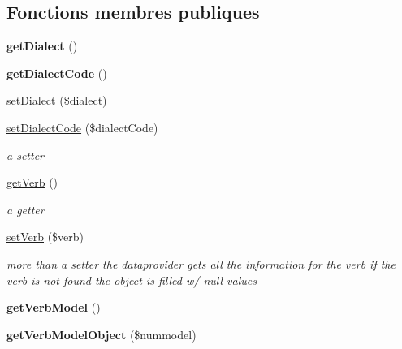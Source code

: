 \subsection*{Fonctions membres publiques}
\begin{DoxyCompactItemize}
\item 
\hypertarget{classConjugationManagerBase_a50aa5bd320294aa9683a54dc1b51273f}{}\label{classConjugationManagerBase_a50aa5bd320294aa9683a54dc1b51273f} 
{\bfseries get\+Dialect} ()
\item 
\hypertarget{classConjugationManagerBase_a4f3830c6823fd2add6dc25a69a0e507c}{}\label{classConjugationManagerBase_a4f3830c6823fd2add6dc25a69a0e507c} 
{\bfseries get\+Dialect\+Code} ()
\item 
\hyperlink{classConjugationManagerBase_a266802b93062d79fa75c460dc72945d8}{set\+Dialect} (\$dialect)
\item 
\hyperlink{classConjugationManagerBase_a98c6196247fa40cca8701324bdf36897}{set\+Dialect\+Code} (\$dialect\+Code)
\begin{DoxyCompactList}\small\item\em a setter \end{DoxyCompactList}\item 
\hyperlink{classConjugationManagerBase_ae6e9d7d21418b8b9831b2b1f29eca4a6}{get\+Verb} ()
\begin{DoxyCompactList}\small\item\em a getter \end{DoxyCompactList}\item 
\hyperlink{classConjugationManagerBase_a36a53a9f0bc2114a5429bcf9e3cd351e}{set\+Verb} (\$verb)
\begin{DoxyCompactList}\small\item\em more than a setter the dataprovider gets all the information for the verb if the verb is not found the object is filled w/ null values \end{DoxyCompactList}\item 
\hypertarget{classConjugationManagerBase_aecf22ced680433bb1c366d0de3931bac}{}\label{classConjugationManagerBase_aecf22ced680433bb1c366d0de3931bac} 
{\bfseries get\+Verb\+Model} ()
\item 
\hypertarget{classConjugationManagerBase_a7169d09d7207a9ca1ad4cda9a319effd}{}\label{classConjugationManagerBase_a7169d09d7207a9ca1ad4cda9a319effd} 
{\bfseries get\+Verb\+Model\+Object} (\$nummodel)
\item 
\hypertarget{classConjugationManagerBase_a3fca72bd4f7e23d7c7e5a4b3b209387b}{}\label{classConjugationManagerBase_a3fca72bd4f7e23d7c7e5a4b3b209387b} 

\end{DoxyCompactItemize}
